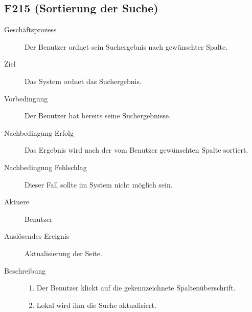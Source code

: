 \subsection{F215 (Sortierung der Suche)}
\begin{description}
  \item[Geschäftsprozess]Der Benutzer ordnet sein Suchergebnis nach gewünschter Spalte.
  \item[Ziel]Das System ordnet das Suchergebnis.
  \item[Vorbedingung]Der Benutzer hat bereits seine Suchergebnisse.
  \item[Nachbedingung Erfolg]Das Ergebnis wird nach der vom Benutzer gewünschten Spalte sortiert.
  \item[Nachbedingung Fehlschlag]Dieser Fall sollte im System nicht möglich sein.
  \item[Aktuere]Benutzer
  \item[Auslösendes Ereignis]Aktualisierung der Seite.
  \item[Beschreibung]\hfill
    \begin{enumerate}
      \item Der Benutzer klickt auf die gekennzeichnete Spaltenüberschrift.
      \item Lokal wird ihm die Suche aktualisiert.
    \end{enumerate}
\end{description}

